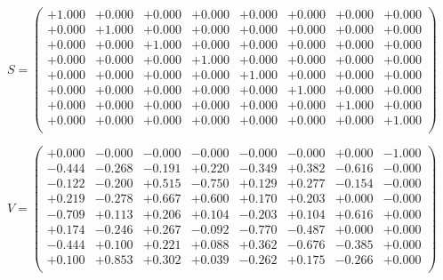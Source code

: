 \documentclass[9pt]{article}
\theoremstyle{plain}
\theoremstyle{definition}
\theoremstyle{remark}
\numberwithin{equation}{section}
\begin{document}
$S = \left(
\begin{array}{
cccccccc}
+1.000 & +0.000 & +0.000 & +0.000 & +0.000 & +0.000 & +0.000 & +0.000 \\
+0.000 & +1.000 & +0.000 & +0.000 & +0.000 & +0.000 & +0.000 & +0.000 \\
+0.000 & +0.000 & +1.000 & +0.000 & +0.000 & +0.000 & +0.000 & +0.000 \\
+0.000 & +0.000 & +0.000 & +1.000 & +0.000 & +0.000 & +0.000 & +0.000 \\
+0.000 & +0.000 & +0.000 & +0.000 & +1.000 & +0.000 & +0.000 & +0.000 \\
+0.000 & +0.000 & +0.000 & +0.000 & +0.000 & +1.000 & +0.000 & +0.000 \\
+0.000 & +0.000 & +0.000 & +0.000 & +0.000 & +0.000 & +1.000 & +0.000 \\
+0.000 & +0.000 & +0.000 & +0.000 & +0.000 & +0.000 & +0.000 & +1.000 \\
\end{array}
\right)$ \newline 

$V = \left(
\begin{array}{
cccccccc}
+0.000 & -0.000 & -0.000 & -0.000 & -0.000 & -0.000 & +0.000 & -1.000 \\
-0.444 & -0.268 & -0.191 & +0.220 & -0.349 & +0.382 & -0.616 & -0.000 \\
-0.122 & -0.200 & +0.515 & -0.750 & +0.129 & +0.277 & -0.154 & -0.000 \\
+0.219 & -0.278 & +0.667 & +0.600 & +0.170 & +0.203 & +0.000 & -0.000 \\
-0.709 & +0.113 & +0.206 & +0.104 & -0.203 & +0.104 & +0.616 & +0.000 \\
+0.174 & -0.246 & +0.267 & -0.092 & -0.770 & -0.487 & +0.000 & +0.000 \\
-0.444 & +0.100 & +0.221 & +0.088 & +0.362 & -0.676 & -0.385 & +0.000 \\
+0.100 & +0.853 & +0.302 & +0.039 & -0.262 & +0.175 & -0.266 & +0.000 \\
\end{array}
\right)$ \newline 
\end{document}
